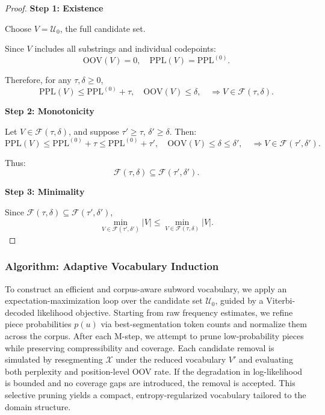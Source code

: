 \begin{proof}
	\textbf{Step 1: Existence}
	
	Choose \(V = \mathcal U_0\), the full candidate set.
	
	Since \(V\) includes all substrings and individual codepoints:
	\[
	\mathrm{OOV}(V) = 0,
	\quad
	\mathrm{PPL}(V) = \mathrm{PPL}^{(0)}.
	\]
	
	Therefore, for any \(\tau,\delta \ge 0\),
	\[
	\mathrm{PPL}(V) \le \mathrm{PPL}^{(0)} + \tau,
	\quad
	\mathrm{OOV}(V) \le \delta,
	\quad
	\Rightarrow
	V \in \mathcal F(\tau,\delta).
	\]
	
	\textbf{Step 2: Monotonicity}
	
	Let \(V \in \mathcal F(\tau,\delta)\), and suppose \(\tau' \ge \tau\), \(\delta' \ge \delta\). Then:
	\[
	\mathrm{PPL}(V) \le \mathrm{PPL}^{(0)} + \tau \le \mathrm{PPL}^{(0)} + \tau',
	\quad
	\mathrm{OOV}(V) \le \delta \le \delta',
	\quad
	\Rightarrow
	V \in \mathcal F(\tau',\delta').
	\]
	
	Thus:
	\[
	\mathcal F(\tau,\delta) \subseteq \mathcal F(\tau',\delta').
	\]
	
	\textbf{Step 3: Minimality}
	
	Since \(\mathcal F(\tau,\delta) \subseteq \mathcal F(\tau',\delta')\),
	\[
	\min_{V \in \mathcal F(\tau',\delta')} |V| \le \min_{V \in \mathcal F(\tau,\delta)} |V|.
	\]
\end{proof}

\subsubsection{Algorithm: Adaptive Vocabulary Induction}

To construct an efficient and corpus-aware subword vocabulary, we apply an expectation-maximization loop over the candidate set \(\mathcal{U}_0\), guided by a Viterbi-decoded likelihood objective. Starting from raw frequency estimates, we refine piece probabilities \(p(u)\) via best-segmentation token counts and normalize them across the corpus. After each M-step, we attempt to prune low-probability pieces while preserving compressibility and coverage. Each candidate removal is simulated by resegmenting \(\mathcal{X}\) under the reduced vocabulary \(V'\) and evaluating both perplexity and position-level OOV rate. If the degradation in log-likelihood is bounded and no coverage gaps are introduced, the removal is accepted. This selective pruning yields a compact, entropy-regularized vocabulary tailored to the domain structure.

